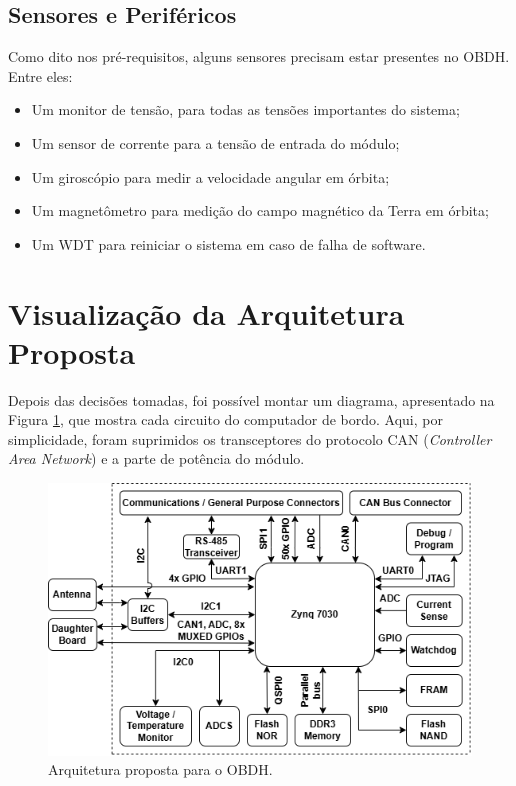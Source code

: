 \subsection{Sensores e Periféricos}
Como dito nos pré-requisitos, alguns sensores precisam estar presentes no OBDH. Entre eles:

\begin{itemize}
	\item Um monitor de tensão, para todas as tensões importantes do sistema;
	\item Um sensor de corrente para a tensão de entrada do módulo;
	\item Um giroscópio para medir a velocidade angular em órbita;
	\item Um magnetômetro para medição do campo magnético da Terra em órbita;
	\item Um WDT para reiniciar o sistema em caso de falha de software.
\end{itemize}

\section{Visualização da Arquitetura Proposta}

Depois das decisões tomadas, foi possível montar um diagrama, apresentado na Figura \ref{fig:arq}, que mostra cada circuito do computador de bordo. Aqui, por simplicidade, foram suprimidos os transceptores do protocolo CAN (\textit{Controller Area Network}) e a parte de potência do módulo. 

\begin{figure}[H]
    \centering
    \includegraphics[scale=0.8]{images/arquitetura final.png}
    \caption{Arquitetura proposta para o OBDH.}
    \label{fig:arq}
\end{figure}

